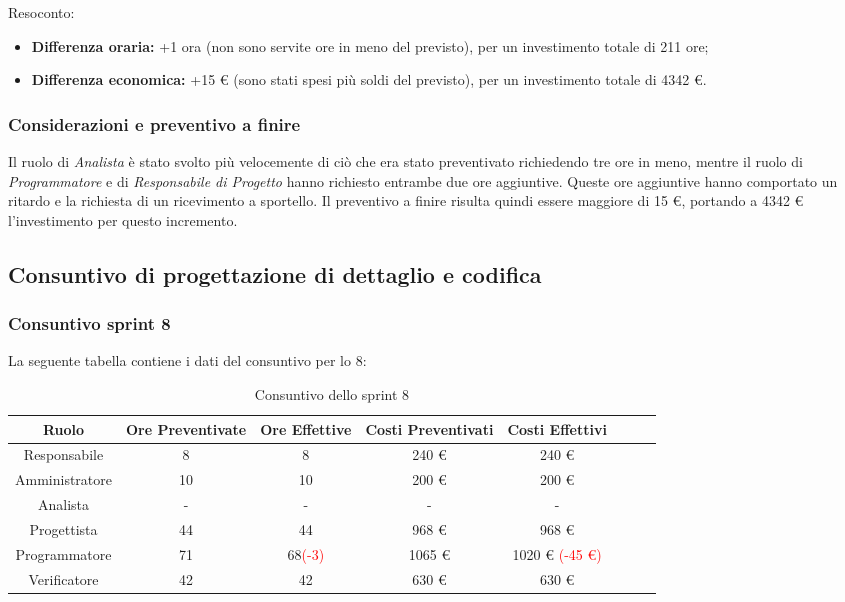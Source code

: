 Resoconto:
\begin{itemize}
	\item \textbf{Differenza oraria:} +1 ora (non sono servite ore in meno del previsto), per un investimento totale di 211 ore;
	\item \textbf{Differenza economica:} +15 \euro{} (sono stati spesi più soldi del previsto), per un investimento totale di 4342 \euro{}.
\end{itemize}
	


\subsubsection{Considerazioni e preventivo a finire}
Il ruolo di \textit{Analista} è stato svolto più velocemente di ciò che era stato preventivato richiedendo tre ore in meno, mentre il ruolo di \textit{Programmatore} e di \textit{Responsabile di Progetto} hanno richiesto entrambe due ore aggiuntive. Queste ore aggiuntive hanno comportato un ritardo e la richiesta di un ricevimento a sportello.\newline{}
Il preventivo a finire risulta quindi essere maggiore di 15 \euro{}, portando a 4342 \euro{} l'investimento per questo incremento.

\subsection{Consuntivo di progettazione di dettaglio e codifica}

\subsubsection{Consuntivo sprint 8}

La seguente tabella contiene i dati del consuntivo per lo  8:
\begin{table}[H]
		\begin{center}
			\setlength{\aboverulesep}{0pt}
			\setlength{\belowrulesep}{0pt}
			\setlength{\extrarowheight}{.75ex}
			\begin{tabular}{ c c c c c c c c }
				\rowcolor{AzzurroGruppo!30} 
				\textbf{Ruolo} & \textbf{Ore Preventivate} & \textbf{Ore Effettive} & \textbf{Costi Preventivati} & \textbf{Costi Effettivi}\\
				\toprule
				Responsabile   & 8 & 8 & 240 \euro{}  & 240 \euro{}\\
				Amministratore & 10 & 10 & 200 \euro{}  & 200 \euro{} \\
				Analista       & - & - & -  & - \\
				Progettista    & 44 & 44 & 968 \euro{} & 968 \euro{} \\
				Programmatore  & 71 & 68\textcolor{red}{(-3)} & 1065 \euro{}  & 1020 \euro{} \textcolor{red}{(-45 \euro{})} \\
				Verificatore   & 42 & 42 & 630 \euro{}  & 630 \euro{} \\
				\bottomrule
			\end{tabular}
			\caption{Consuntivo dello sprint 8}
		\end{center}
	\end{table}
	
